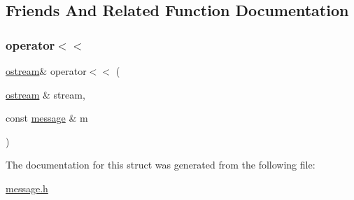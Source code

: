 \subsection{Friends And Related Function Documentation}
\mbox{\label{structmui_1_1message_a4fbfde81d9ba815d34bfb6f79a66882a}} 
\subsubsection{\texorpdfstring{operator$<$$<$}{operator<<}}
{\footnotesize\ttfamily \hyperlink{classmui_1_1ostream}{ostream}\& operator$<$$<$ (\begin{DoxyParamCaption}\item[{\hyperlink{classmui_1_1ostream}{ostream} \&}]{stream,  }\item[{const \hyperlink{structmui_1_1message}{message} \&}]{m }\end{DoxyParamCaption})\hspace{0.3cm}{\ttfamily [friend]}}



The documentation for this struct was generated from the following file\+:\begin{DoxyCompactItemize}
\item 
\hyperlink{message_8h}{message.\+h}\end{DoxyCompactItemize}
